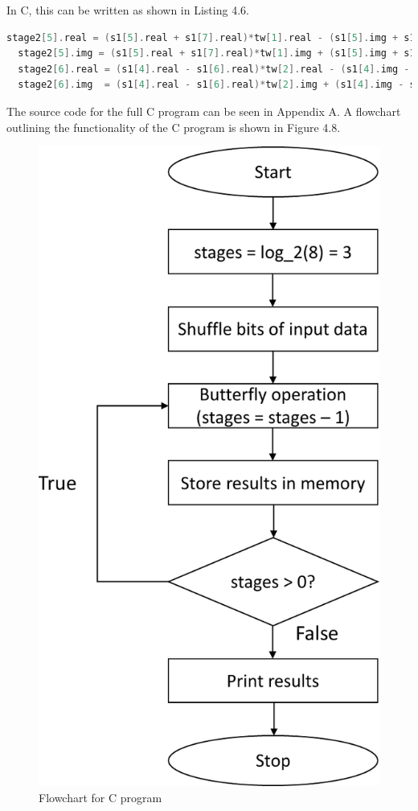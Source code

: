 \documentclass[12pt,a4paper]{report} %
\begin{document}
In C, this can be written as shown in Listing 4.6.
\begin{lstlisting}[caption={Example butterfly operations in C},captionpos=b,language=C,frame=single]
  stage2[5].real = (s1[5].real + s1[7].real)*tw[1].real - (s1[5].img + s1[7].img)*tw[1].img;
  stage2[5].img = (s1[5].real + s1[7].real)*tw[1].img + (s1[5].img + s1[7].img)*tw[1].real;
  stage2[6].real = (s1[4].real - s1[6].real)*tw[2].real - (s1[4].img - s1[6].img)*tw[2].img;
  stage2[6].img  = (s1[4].real - s1[6].real)*tw[2].img + (s1[4].img - s1[6].img)*tw[2].real;
\end{lstlisting}

The source code for the full C program can be seen in Appendix A.
A flowchart outlining the functionality of the C program is shown in Figure 4.8.
\begin{figure}[ht]
\centerline{\includegraphics[scale=0.8]{diagrams/Presentation1}}
\caption{Flowchart for C program}
\end{figure}
\end{document}
